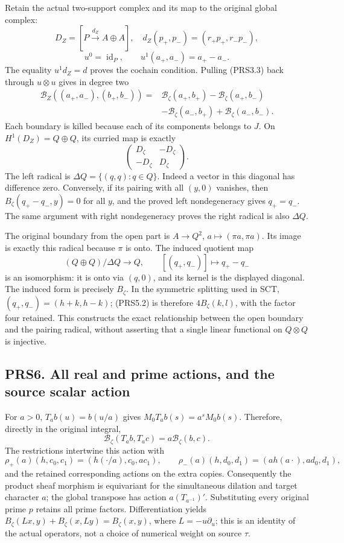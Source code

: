 Retain the actual two-support complex and its map to the original global
complex: \[
D_Z=[P\xrightarrow{d_Z}A\oplus A],\quad
d_Z(p_+,p_-)=(r_+p_+,r_-p_-),
\] \[
u^0=\operatorname{id}_P,\qquad u^1(a_+,a_-)=a_+-a_-.
\tag{PRS5.1}
\] The equality \(u^1d_Z=d\) proves the cochain condition. Pulling
(PRS3.3) back through \(u\otimes u\) gives in degree two \[
\begin{aligned}
\mathcal B_Z((a_+,a_-),(b_+,b_-))={}&\mathcal B_\zeta(a_+,b_+)-\mathcal B_\zeta(a_+,b_-)\\
&-\mathcal B_\zeta(a_-,b_+)+\mathcal B_\zeta(a_-,b_-).
\end{aligned}
\tag{PRS5.2}
\] Each boundary is killed because each of its components belongs to
\(J\). On \(H^1(D_Z)=Q\oplus Q\), its curried map is exactly \[
\begin{pmatrix}D_\zeta&-D_\zeta\\-D_\zeta&D_\zeta\end{pmatrix}.
\tag{PRS5.3}
\] The left radical is \(\Delta Q=\{(q,q):q\in Q\}\). Indeed a vector in
this diagonal has difference zero. Conversely, if its pairing with all
\((y,0)\) vanishes, then \(B_\zeta(q_+-q_-,y)=0\) for all \(y\), and the
proved left nondegeneracy gives \(q_+=q_-\). The same argument with
right nondegeneracy proves the right radical is also \(\Delta Q\).

The original boundary from the open part is \(A\to Q^2\),
\(a\mapsto(\pi a,\pi a)\). Its image is exactly this radical because
\(\pi\) is onto. The induced quotient map \[
(Q\oplus Q)/\Delta Q\longrightarrow Q,\qquad [(q_+,q_-)]\longmapsto q_+-q_-
\tag{PRS5.4}
\] is an isomorphism: it is onto via \((q,0)\), and its kernel is the
displayed diagonal. The induced form is precisely \(B_\zeta\). In the
symmetric splitting used in SCT, \((q_+,q_-)=(h+k,h-k)\); (PRS5.2) is
therefore \(4B_\zeta(k,l)\), with the factor four retained. This
constructs the exact relationship between the open boundary and the
pairing radical, without asserting that a single linear functional on
\(Q\otimes Q\) is injective.

\subsection{PRS6. All real and prime actions, and the source scalar
action}\label{prs6.-all-real-and-prime-actions-and-the-source-scalar-action}

For \(a>0\), \(T_ab(u)=b(u/a)\) gives \(M_0T_ab(s)=a^sM_0b(s)\).
Therefore, directly in the original integral, \[
\mathcal B_\zeta(T_ab,T_ac)=a\mathcal B_\zeta(b,c).
\tag{PRS6.1}
\] The restrictions intertwine this action with \[
\rho_+(a)(h,c_0,c_1)=(h(\cdot/a),c_0,ac_1),\qquad
\rho_-(a)(h,d_0,d_1)=(a h(a\cdot),ad_0,d_1),
\] and the retained corresponding actions on the extra copies.
Consequently the product sheaf morphism is equivariant for the
simultaneous dilation and target character \(a\); the global transpose
has action \(a(T_{a^{-1}})'\). Substituting every original prime \(p\)
retains all prime factors. Differentiation yields
\(B_\zeta(Lx,y)+B_\zeta(x,Ly)=B_\zeta(x,y)\), where \(L=-u\partial_u\);
this is an identity of the actual operators, not a choice of numerical
weight on source \(\tau\).

